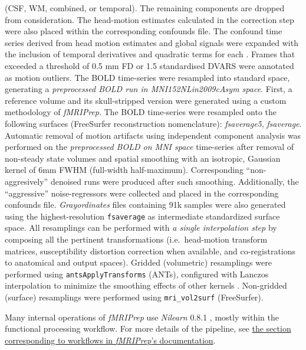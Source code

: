 \documentclass[
]{article}
\begin{document}
\begin{description}
(CSF, WM, combined, or temporal). The remaining components are dropped
from consideration. The head-motion estimates calculated in the
correction step were also placed within the corresponding confounds
file. The confound time series derived from head motion estimates and
global signals were expanded with the inclusion of temporal derivatives
and quadratic terms for each \citep{confounds_satterthwaite_2013}.
Frames that exceeded a threshold of 0.5 mm FD or 1.5 standardised DVARS
were annotated as motion outliers. The BOLD time-series were resampled
into standard space, generating a \emph{preprocessed BOLD run in
MNI152NLin2009cAsym space}. First, a reference volume and its
skull-stripped version were generated using a custom methodology of
\emph{fMRIPrep}. The BOLD time-series were resampled onto the following
surfaces (FreeSurfer reconstruction nomenclature): \emph{fsaverage5},
\emph{fsaverage}. Automatic removal of motion artifacts using
independent component analysis \citep[ICA-AROMA,][]{aroma} was performed
on the \emph{preprocessed BOLD on MNI space} time-series after removal
of non-steady state volumes and spatial smoothing with an isotropic,
Gaussian kernel of 6mm FWHM (full-width half-maximum). Corresponding
``non-aggresively'' denoised runs were produced after such smoothing.
Additionally, the ``aggressive'' noise-regressors were collected and
placed in the corresponding confounds file. \emph{Grayordinates} files
\citep{hcppipelines} containing 91k samples were also generated using
the highest-resolution \texttt{fsaverage} as intermediate standardized
surface space. All resamplings can be performed with \emph{a single
interpolation step} by composing all the pertinent transformations
(i.e.~head-motion transform matrices, susceptibility distortion
correction when available, and co-registrations to anatomical and output
spaces). Gridded (volumetric) resamplings were performed using
\texttt{antsApplyTransforms} (ANTs), configured with Lanczos
interpolation to minimize the smoothing effects of other kernels
\citep{lanczos}. Non-gridded (surface) resamplings were performed using
\texttt{mri\_vol2surf} (FreeSurfer).
\end{description}

Many internal operations of \emph{fMRIPrep} use \emph{Nilearn} 0.8.1
\citep[RRID:SCR\_001362]{nilearn}, mostly within the functional
processing workflow. For more details of the pipeline, see
\href{https://fmriprep.readthedocs.io/en/latest/workflows.html}{the
section corresponding to workflows in \emph{fMRIPrep}'s documentation}.
\end{document}
